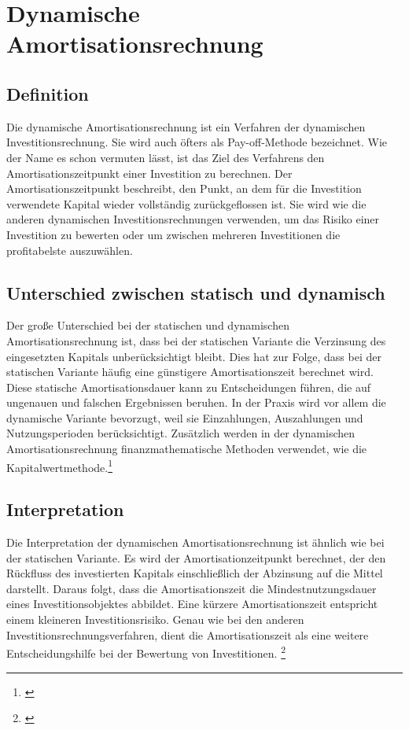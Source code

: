 \chapter{Dynamische Amortisationsrechnung}
\label{Dynamische Amortisationsrechnung}

\section{Definition}
Die dynamische Amortisationsrechnung ist ein Verfahren der dynamischen Investitionsrechnung. Sie wird auch öfters als Pay-off-Methode bezeichnet. Wie der Name es schon vermuten lässt, ist das Ziel des Verfahrens den Amortisationszeitpunkt einer Investition zu berechnen. Der Amortisationszeitpunkt beschreibt, den Punkt, an dem für die Investition verwendete Kapital wieder vollständig zurückgeflossen ist. Sie wird wie die anderen dynamischen Investitionsrechnungen verwenden, um das Risiko einer Investition zu bewerten oder um zwischen mehreren Investitionen die profitabelste auszuwählen.
\section{Unterschied zwischen statisch und dynamisch}
Der große Unterschied bei der statischen und dynamischen Amortisationsrechnung ist, dass bei der statischen Variante die Verzinsung des eingesetzten Kapitals unberücksichtigt bleibt. Dies hat zur Folge, dass bei der statischen Variante häufig eine günstigere Amortisationszeit berechnet wird. Diese statische Amortisationsdauer kann zu Entscheidungen führen, die auf ungenauen und falschen Ergebnissen beruhen. In der Praxis wird vor allem die dynamische Variante bevorzugt, weil sie Einzahlungen, Auszahlungen und Nutzungsperioden berücksichtigt. Zusätzlich werden in der dynamischen Amortisationsrechnung finanzmathematische Methoden verwendet, wie die Kapitalwertmethode.\footnote{\cite{gevestor}}
\newpage
\section{Interpretation}
Die Interpretation der dynamischen Amortisationsrechnung ist ähnlich wie bei der statischen Variante. Es wird der Amortisationzeitpunkt
berechnet, der den Rückfluss des investierten Kapitals einschließlich der Abzinsung auf die Mittel darstellt. Daraus folgt, dass die Amortisationszeit die Mindestnutzungsdauer eines Investitionsobjektes abbildet. Eine kürzere Amortisationszeit entspricht einem kleineren Investitionsrisiko. Genau wie bei den anderen Investitionsrechnungsverfahren, dient die Amortisationszeit als eine weitere Entscheidungshilfe bei der Bewertung von Investitionen.
\footnote{\cite{gevestor}}
